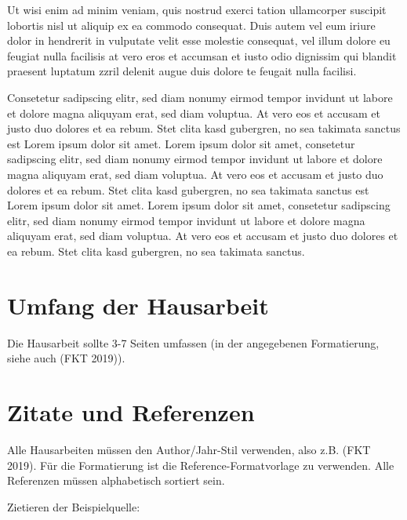Ut wisi enim ad minim veniam, quis nostrud exerci tation ullamcorper suscipit lobortis nisl ut aliquip ex ea commodo consequat. Duis autem vel eum iriure dolor in hendrerit in vulputate velit esse molestie consequat, vel illum dolore eu feugiat nulla facilisis at vero eros et accumsan et iusto odio dignissim qui blandit praesent luptatum zzril delenit augue duis dolore te feugait nulla facilisi.   


Consetetur sadipscing elitr, sed diam nonumy eirmod tempor invidunt ut labore et dolore magna aliquyam erat, sed diam voluptua. At vero eos et accusam et justo duo dolores et ea rebum. Stet clita kasd gubergren, no sea takimata sanctus est Lorem ipsum dolor sit amet. Lorem ipsum dolor sit amet, consetetur sadipscing elitr, sed diam nonumy eirmod tempor invidunt ut labore et dolore magna aliquyam erat, sed diam voluptua. At vero eos et accusam et justo duo dolores et ea rebum. Stet clita kasd gubergren, no sea takimata sanctus est Lorem ipsum dolor sit amet. Lorem ipsum dolor sit amet, consetetur sadipscing elitr, sed diam nonumy eirmod tempor invidunt ut labore et dolore magna aliquyam erat, sed diam voluptua. At vero eos et accusam et justo duo dolores et ea rebum. Stet clita kasd gubergren, no sea takimata sanctus.  

\section{Umfang der Hausarbeit}
Die Hausarbeit sollte 3-7 Seiten umfassen (in der angegebenen Formatierung, siehe auch (FKT 2019)).
\section{Zitate und Referenzen}
Alle Hausarbeiten müssen den Author/Jahr-Stil verwenden, also z.B. (FKT 2019).
Für die Formatierung ist die Reference-Formatvorlage zu verwenden. Alle Referenzen müssen alphabetisch sortiert sein.

Zietieren der Beispielquelle: \cite{beispiel}


